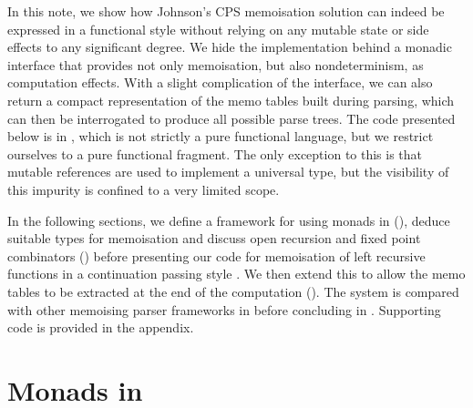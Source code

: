 In this note, we show how Johnson's CPS memoisation solution can indeed be
expressed in a functional style without relying on any mutable
state or side effects to any significant degree. 
We hide the implementation behind a monadic interface that provides
not only memoisation, but also nondeterminism, as computation effects.
With a slight complication of the 
interface, we can also return a compact representation of the memo tables 
built during parsing, which can then
be interrogated to produce all possible parse trees.
The code presented below is in \OCaml, which is not strictly a pure functional
language, but we restrict ourselves to a pure functional fragment. The only exception
to this is that mutable references are used to implement a universal type, but
the visibility of this impurity is confined to a very limited scope.

In the following sections, we define a framework for using monads in \OCaml (),
deduce suitable types for memoisation and discuss open recursion and fixed point
combinators () before presenting our code for memoisation of left recursive functions
in a continuation passing style . We then extend this to allow the
memo tables to be extracted at the end of the computation ().
The system is compared with other memoising parser frameworks in 
before concluding in .
Supporting code is provided in the appendix.

\section{Monads in \OCaml}
\label{s:monads}

